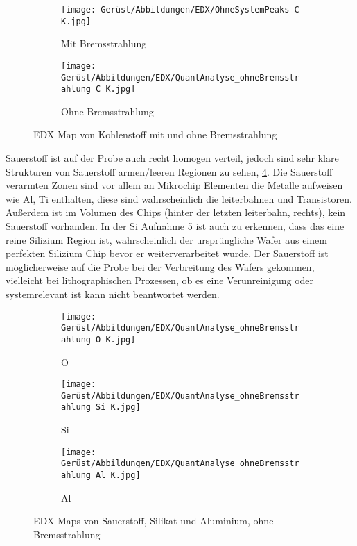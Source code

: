 \begin{figure}[H]
     \centering
     \begin{subfigure}[b]{0.49\textwidth}
         \centering
         \texttt{[image: Gerüst/Abbildungen/EDX/OhneSystemPeaks C K.jpg]}
         \caption{Mit Bremsstrahlung}
         \label{EDXCmBS}
     \end{subfigure}
     \hfill
     \begin{subfigure}[b]{0.49\textwidth}
         \centering
         \texttt{[image: Gerüst/Abbildungen/EDX/QuantAnalyse\_ohneBremsstrahlung C K.jpg]}
         \caption{Ohne Bremsstrahlung}
         \label{EDXCoBS}
     \end{subfigure}
        \caption{EDX Map von Kohlenstoff mit und ohne Bremsstrahlung}
        \label{EDXC}
\end{figure}

Sauerstoff ist auf der Probe auch recht homogen verteil, jedoch sind sehr klare Strukturen von Sauerstoff armen/leeren Regionen zu sehen, \cref{EDXO}. Die Sauerstoff verarmten Zonen sind vor allem an Mikrochip Elementen die Metalle aufweisen wie Al, Ti enthalten, diese sind wahrscheinlich die leiterbahnen und Transistoren. Außerdem ist im Volumen des Chips (hinter der letzten leiterbahn, rechts), kein Sauerstoff vorhanden. In der Si Aufnahme \cref{EDXSi} ist auch zu erkennen, dass das eine reine Silizium Region ist, wahrscheinlich der ursprüngliche Wafer aus einem perfekten Silizium Chip bevor er weiterverarbeitet wurde. Der Sauerstoff ist möglicherweise auf die Probe bei der Verbreitung des Wafers gekommen, vielleicht bei lithographischen Prozessen, ob es eine Verunreinigung oder systemrelevant ist kann nicht beantwortet werden.

\begin{figure}
     \centering
     \begin{subfigure}[b]{0.3\textwidth}
         \centering
         \texttt{[image: Gerüst/Abbildungen/EDX/QuantAnalyse\_ohneBremsstrahlung O K.jpg]}
         \caption{O}
         \label{EDXO}
     \end{subfigure}
     \hfill
     \begin{subfigure}[b]{0.3\textwidth}
         \centering
         \texttt{[image: Gerüst/Abbildungen/EDX/QuantAnalyse\_ohneBremsstrahlung Si K.jpg]}
         \caption{Si}
         \label{EDXSi}
     \end{subfigure}
     \hfill
     \begin{subfigure}[b]{0.3\textwidth}
         \centering
         \texttt{[image: Gerüst/Abbildungen/EDX/QuantAnalyse\_ohneBremsstrahlung Al K.jpg]}
         \caption{Al}
         \label{EDXAl}
     \end{subfigure}
        \caption{EDX Maps von Sauerstoff, Silikat und Aluminium, ohne Bremsstrahlung}
        \label{EDXCSiAl}
\end{figure}

